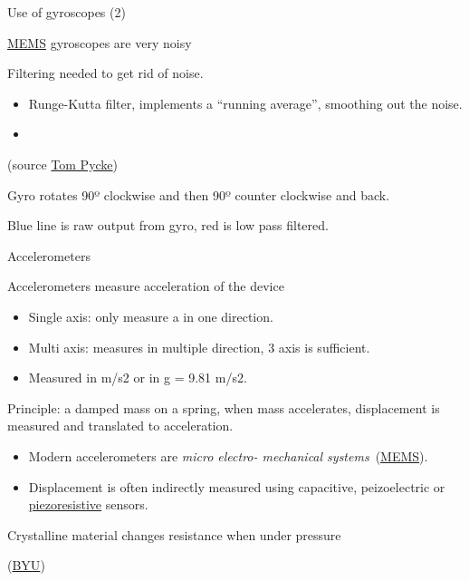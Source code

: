 \documentclass[compress]{beamer}
\begin{document}
\begin{frame}{Use of gyroscopes (2)}

\href{http://en.wikipedia.org/wiki/Microelectromechanical_systems}{MEMS}
gyroscopes are very noisy

Filtering needed to get rid of noise.

\begin{itemize}

\item
  Runge-Kutta filter, implements a ``running average'', smoothing out
  the noise.
\end{itemize}

\begin{itemize}

\item
  ~
\end{itemize}

(source
\href{http://tom.pycke.be/mav/70/gyroscope-to-roll-pitch-and-yaw}{Tom
Pycke})

Gyro rotates 90º clockwise and then 90º counter clockwise and back.

Blue line is raw output from gyro, red is low pass filtered.

\end{frame}

\begin{frame}{Accelerometers}

Accelerometers measure acceleration of the device

\begin{itemize}

\item
  Single axis: only measure a in one direction.
\item
  Multi axis: measures in multiple direction, 3 axis is sufficient.
\item
  Measured in m/s2 or in g = 9.81 m/s2.
\end{itemize}

Principle: a damped mass on a spring, when mass accelerates,
displacement is measured and translated to acceleration.

\begin{itemize}

\item
  Modern accelerometers are \emph{micro electro- mechanical
  systems}~(\href{http://en.wikipedia.org/wiki/Microelectromechanical_systems}{MEMS}).
\item
  Displacement is often indirectly measured using capacitive,
  peizoelectric or
  \href{http://en.wikipedia.org/wiki/Piezoresistive_effect}{piezoresistive}
  sensors.
\end{itemize}

Crystalline material changes resistance when under pressure

(\href{http://research.et.byu.edu/llhwww/intro/memsintro.html}{BYU})

\end{frame}
\end{document}
